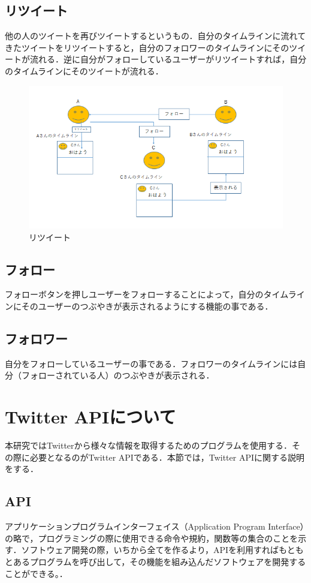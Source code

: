 \subsection{リツイート}
他の人のツイートを再びツイートするというもの．自分のタイムラインに流れてきたツイートをリツイートすると，自分のフォロワーのタイムラインにそのツイートが流れる．逆に自分がフォローしているユーザーがリツイートすれば，自分のタイムラインにそのツイートが流れる．
\begin{figure}[htb]
\centering
\includegraphics[width=15cm]{retweet.png}
\caption{リツイート}\label{retweet}
\end{figure}
\subsection{フォロー}

フォローボタンを押しユーザーをフォローすることによって，自分のタイムラインにそのユーザーのつぶやきが表示されるようにする機能の事である．

\subsection{フォロワー}

自分をフォローしているユーザーの事である．フォロワーのタイムラインには自分（フォローされている人）のつぶやきが表示される．

\section{Twitter APIについて}
本研究ではTwitterから様々な情報を取得するためのプログラムを使用する．その際に必要となるのがTwitter APIである．本節では，Twitter APIに関する説明をする．

\subsection{API}
アプリケーションプログラムインターフェイス（Application Program Interface）の略で，プログラミングの際に使用できる命令や規約，関数等の集合のことを示す．ソフトウェア開発の際，いちから全てを作るより，APIを利用すればもともとあるプログラムを呼び出して，その機能を組み込んだソフトウェアを開発することができる。．
